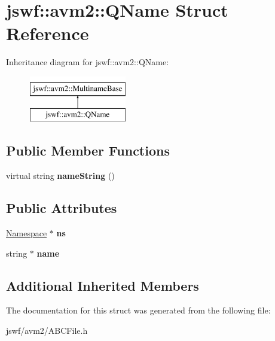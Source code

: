 \hypertarget{structjswf_1_1avm2_1_1_q_name}{\section{jswf\+:\+:avm2\+:\+:Q\+Name Struct Reference}
\label{structjswf_1_1avm2_1_1_q_name}
}
Inheritance diagram for jswf\+:\+:avm2\+:\+:Q\+Name\+:\begin{figure}[H]
\begin{center}
\leavevmode
\includegraphics[height=2.000000cm]{structjswf_1_1avm2_1_1_q_name}
\end{center}
\end{figure}
\subsection*{Public Member Functions}
\begin{DoxyCompactItemize}
\item 
\hypertarget{structjswf_1_1avm2_1_1_q_name_a7aa62c91a48685c36ab6e79921a10359}{virtual string {\bfseries name\+String} ()}\label{structjswf_1_1avm2_1_1_q_name_a7aa62c91a48685c36ab6e79921a10359}

\end{DoxyCompactItemize}
\subsection*{Public Attributes}
\begin{DoxyCompactItemize}
\item 
\hypertarget{structjswf_1_1avm2_1_1_q_name_af46753ef086fe46b700bcdc9869e86a7}{\hyperlink{structjswf_1_1avm2_1_1_namespace}{Namespace} $\ast$ {\bfseries ns}}\label{structjswf_1_1avm2_1_1_q_name_af46753ef086fe46b700bcdc9869e86a7}

\item 
\hypertarget{structjswf_1_1avm2_1_1_q_name_aded22bb43f7f87d83f10919201a4a29c}{string $\ast$ {\bfseries name}}\label{structjswf_1_1avm2_1_1_q_name_aded22bb43f7f87d83f10919201a4a29c}

\end{DoxyCompactItemize}
\subsection*{Additional Inherited Members}


The documentation for this struct was generated from the following file\+:\begin{DoxyCompactItemize}
\item 
jswf/avm2/A\+B\+C\+File.\+h\end{DoxyCompactItemize}
